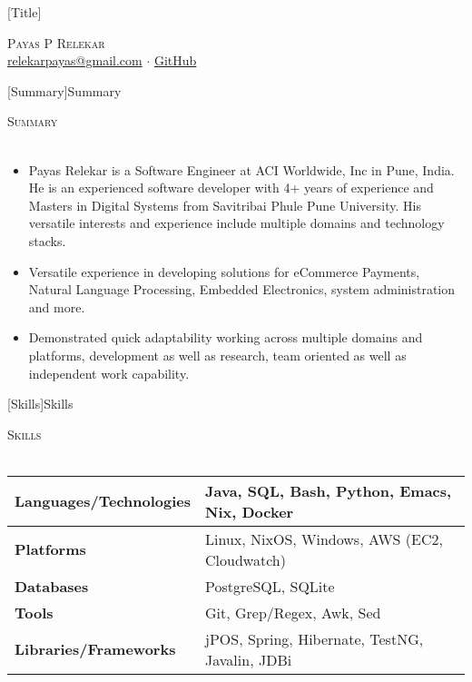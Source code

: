 \documentclass[a4paper]{article}
\newcommand{\lineunder} {
    \vspace*{-8pt} \\
    \hspace*{-18pt} \hrulefill \\
}
\newcommand{\header} [1] {
    {\hspace*{-18pt}\vspace*{6pt} \textsc{#1}}
    \vspace*{-6pt} \lineunder
}
\begin{document}
\vspace*{-40pt}

\vspace*{-10pt}
[Title]{}
\begin{center}
  {\Huge \scshape {Payas P Relekar}}\\
  \href{mailto:relekarpayas@gmail.com}{relekarpayas@gmail.com} $\cdot$ \href{https://github.com/bhankas/}{GitHub}\\
\end{center}

[Summary]{Summary}
\header{Summary}
\vspace{1mm}

\begin{itemize} \itemsep 1pt
  \item Payas Relekar is a Software Engineer at ACI Worldwide, Inc in Pune, India. He is an experienced software developer with 4+ years of experience and Masters in Digital Systems from Savitribai Phule Pune University. His versatile interests and experience include multiple domains and technology stacks.
  \item Versatile experience in developing solutions for eCommerce Payments, Natural Language Processing, Embedded Electronics, system administration and more.
  \item Demonstrated quick adaptability working across multiple domains and platforms, development as well as research, team oriented as well as independent work capability.
\end{itemize}

[Skills]{Skills}
\header{Skills}
\vspace{1mm}
\bgroup
\setlength{\arrayrulewidth}{0.2mm}
\def\arraystretch{1.2}
\begin{tabularx}{\textwidth}{ | X | X | }
  \hline
  \textbf{Languages/Technologies} & Java, SQL, Bash, Python, Emacs, Nix, Docker        \\
  \hline
  \textbf{Platforms}             & Linux, NixOS, Windows, AWS (EC2, Cloudwatch)          \\
  \hline
  \textbf{Databases}             & PostgreSQL, SQLite          \\
  \hline
  \textbf{Tools}                 & Git, Grep/Regex, Awk, Sed            \\
  \hline
  \textbf{Libraries/Frameworks}  & jPOS, Spring, Hibernate, TestNG, Javalin, JDBi \\
  \hline
\end{tabularx}
\egroup
\vspace{2mm}
\end{document}
